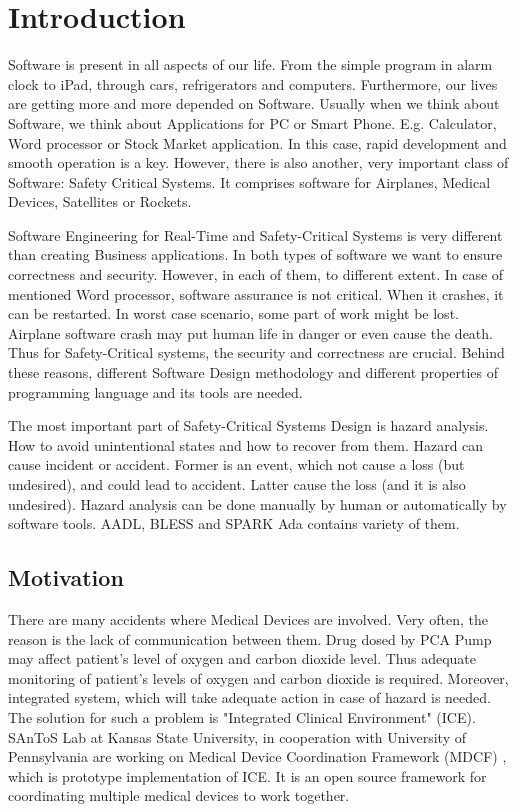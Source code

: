 
\cleardoublepage


\chapter{Introduction}
\label{introduction}

Software is present in all aspects of our life. From the simple program in alarm clock to iPad, through cars, refrigerators and computers. Furthermore, our lives are getting more and more depended on Software. Usually when we think about Software, we think about Applications for PC or Smart Phone. E.g. Calculator, Word processor or Stock Market application. In this case, rapid development and smooth operation is a key. However, there is also another, very important class of Software: Safety Critical Systems. It comprises software for Airplanes, Medical Devices, Satellites or Rockets.

Software Engineering for Real-Time and Safety-Critical Systems is very different than creating Business applications. In both types of software we want to ensure correctness and security. However, in each of them, to different extent. In case of mentioned Word processor, software assurance is not critical. When it crashes, it can be restarted. In worst case scenario, some part of work might be lost. Airplane software crash may put human life in danger or even cause the death. Thus for Safety-Critical systems, the security and correctness are crucial. Behind these reasons, different Software Design methodology and different properties of programming language and its tools are needed.

The most important part of Safety-Critical Systems Design is hazard analysis. How to avoid unintentional states and how to recover from them. Hazard can cause incident or accident. Former is an event, which not cause a loss (but undesired), and could lead to accident. Latter cause the loss (and it is also undesired). Hazard analysis can be done manually by human or automatically by software tools. AADL, BLESS and SPARK Ada contains variety of them.


\section{Motivation}
\label{introduction:motivation}
There are many accidents where Medical Devices are involved. Very often, the reason is the lack of communication between them. Drug dosed by PCA Pump may affect patient's level of oxygen and carbon dioxide level. Thus adequate monitoring of patient's levels of oxygen and carbon dioxide is required. Moreover, integrated system, which will take adequate action in case of hazard is needed. The solution for such a problem is "Integrated Clinical Environment" (ICE). SAnToS Lab at Kansas State University, in cooperation with University of Pennsylvania are working on Medical Device Coordination Framework (MDCF) \cite{MedicalApplicationPlatforms:Paper}, which is prototype implementation of ICE. It is an open source framework for coordinating multiple medical devices to work together.

